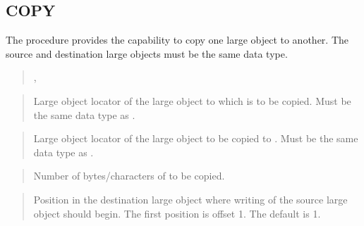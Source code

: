 \documentclass[letterpaper,10pt,english,openany,oneside]{sphinxmanual}
\begin{document}
\subsection{COPY}
\label{\detokenize{copy::doc}}\label{\detokenize{copy:copy}}
The  procedure provides the capability to copy one large object to
another. The source and destination large objects must be the same data
type.
\begin{quote}


,
\begin{quote}


\end{quote}
\end{quote}


\begin{quote}

Large object locator of the large object to which  is to be
copied. Must be the same data type as .
\end{quote}

\begin{quote}

Large object locator of the large object to be copied to .
Must be the same data type as .
\end{quote}

\begin{quote}

Number of bytes/characters of  to be copied.
\end{quote}

\begin{quote}

Position in the destination large object where writing of the source
large object should begin. The first position is offset 1. The default
is 1.
\end{quote}
\end{document}
